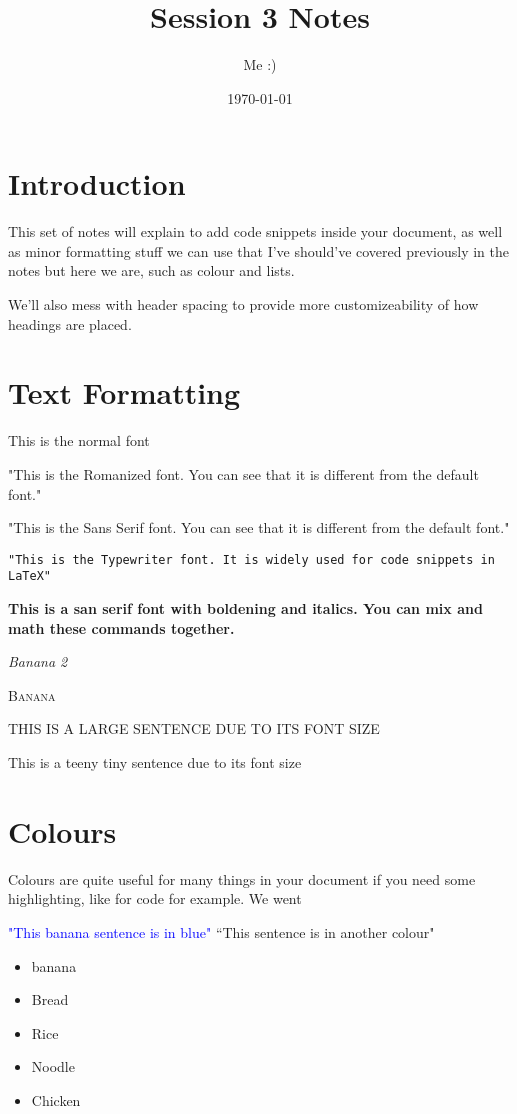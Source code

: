 \documentclass[12pt, a4paper]{article}
\title{Session 3 Notes}
\author{Me :)}
\date{\today}
\begin{document}
  \maketitle

  \section{Introduction}
    This set of notes will explain to add code snippets inside your document, as well as minor formatting stuff we can use that I've should've covered previously in the notes but here we are, such as colour and lists.

    We'll also mess with header spacing to provide more customizeability of how headings are placed.

  \section{Text Formatting}
    This is the normal font

    \textrm{"This is the Romanized font. You can see that it is different from the default font."}

    \textsf{"This is the Sans Serif font. You can see that it is different from the default font."}

    \texttt{"This is the Typewriter font. It is widely used for code snippets in \LaTeX"}

    \textsf{\textbf{This is a san serif font with boldening and italics. You can mix and math these commands together. }}

    \textsf{\textit{Banana 2}}

    \textsc{Banana}


    {\LARGE THIS IS A LARGE SENTENCE DUE TO ITS FONT SIZE}

    {\tiny This is a teeny tiny sentence due to its font size}


  \section{Colours}
    Colours are quite useful for many things in your document if you need some highlighting, like for code for example. We went 

    \textcolor{blue}{"This banana sentence is in blue"}
    \textcolor{randomcol}{``This sentence is in another colour"}

    \begin{itemize}
      \item \textcolor{randomcol}{banana}
      \item Bread
      \item Rice
      \item Noodle
      \item Chicken
    \end{itemize}
\end{document}
